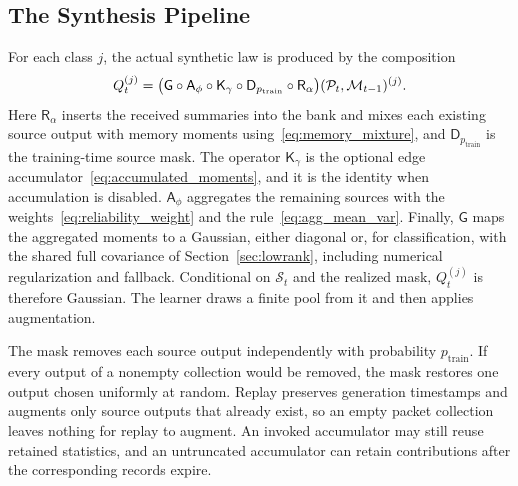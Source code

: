 \subsection{The Synthesis Pipeline}

For each class $j$, the actual synthetic law is produced by the composition
\begin{equation}
 Q_t^{(j)}=
 \bigl(\mathsf G\circ\mathsf A_\phi\circ\mathsf K_\gamma
 \circ\mathsf D_{p_{\mathrm{train}}}\circ\mathsf R_\alpha\bigr)
 (\mathcal P_t,\mathcal{M}_{t-1})^{(j)}.
 \label{eq:synthesis_pipeline}
\end{equation}
Here $\mathsf R_\alpha$ inserts the received summaries into the bank and mixes each existing source output with memory moments using~\eqref{eq:memory_mixture}, and $\mathsf D_{p_{\mathrm{train}}}$ is the training-time source mask. The operator $\mathsf K_\gamma$ is the optional edge accumulator~\eqref{eq:accumulated_moments}, and it is the identity when accumulation is disabled. $\mathsf A_\phi$ aggregates the remaining sources with the weights~\eqref{eq:reliability_weight} and the rule~\eqref{eq:agg_mean_var}. Finally, $\mathsf G$ maps the aggregated moments to a Gaussian, either diagonal or, for classification, with the shared full covariance of Section~\ref{sec:lowrank}, including numerical regularization and fallback. Conditional on $\mathcal S_t$ and the realized mask, $Q_t^{(j)}$ is therefore Gaussian. The learner draws a finite pool from it and then applies augmentation.

The mask removes each source output independently with probability $p_{\mathrm{train}}$. If every output of a nonempty collection would be removed, the mask restores one output chosen uniformly at random. Replay preserves generation timestamps and augments only source outputs that already exist, so an empty packet collection leaves nothing for replay to augment. An invoked accumulator may still reuse retained statistics, and an untruncated accumulator can retain contributions after the corresponding records expire.

